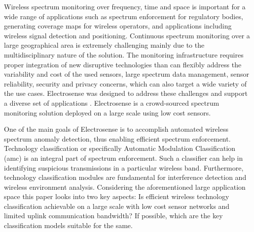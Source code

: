 
Wireless spectrum monitoring over frequency, time and space is important for a wide range of applications such as spectrum enforcement for regulatory bodies, generating coverage maps for wireless operators, and applications including wireless signal detection and positioning. Continuous spectrum monitoring over a large geographical area is extremely challenging mainly due to the multidisciplinary nature of the solution. The monitoring infrastructure requires proper integration of new disruptive technologies than can flexibly address the variability and cost of the used sensors, large spectrum data management, sensor reliability, security and privacy concerns, which can also target a wide variety of the use cases. Electrosense was designed to address these challenges and support a diverse set of applications \cite{electrosense}. Electrosense is a crowd-sourced spectrum monitoring solution deployed on a large scale using low cost sensors.

One of the main goals of Electrosense is to accomplish automated wireless spectrum anomaly detection, thus enabling efficient spectrum enforcement. Technology classification or specifically Automatic Modulation Classification (\ac{amc}) is an integral part of spectrum enforcement. Such a classifier can help in identifying suspicious transmissions in a particular wireless band. Furthermore, technology classification modules are fundamental for interference detection and wireless environment analysis. %
Considering the aforementioned large application space this paper looks into two key aspects: Is efficient wireless technology classification achievable on a large scale with low cost sensor networks and limited uplink communication bandwidth? If possible, which are the key classification models suitable for the same.


